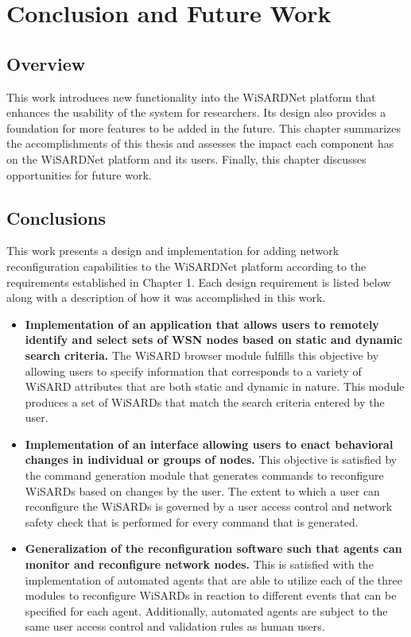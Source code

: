 
\chapter{Conclusion and Future Work}
\label{Chapter 7}


\section{Overview}
This work introduces new functionality into the WiSARDNet platform that enhances the usability of the system for researchers. Its design also provides a foundation for more features to be added in the future. This chapter summarizes the accomplishments of this thesis and assesses the impact each component has on the WiSARDNet platform and its users. Finally, this chapter discusses opportunities for future work. 

\section{Conclusions}
This work presents a design and implementation for adding network reconfiguration capabilities to the WiSARDNet platform according to the requirements established in Chapter 1. Each design requirement is listed below along with a description of how it was accomplished in this work.

\begin{itemize}
	\item \textbf{Implementation of an application that allows users to remotely identify and select sets of WSN nodes based on static and dynamic search criteria.} The WiSARD browser module fulfills this objective by allowing users to specify information that corresponds to a variety of WiSARD attributes that are both static and dynamic in nature. This module produces a set of WiSARDs that match the search criteria entered by the user. 

	\item \textbf{Implementation of an interface allowing users to enact behavioral changes in individual or groups of nodes.} This objective is satisfied by the command generation module that generates commands to reconfigure WiSARDs based on changes by the user. The extent to which a user can reconfigure the WiSARDs is governed by a user access control  and network safety check that is performed for every command that is generated.

	\item \textbf{Generalization of the reconfiguration software such that agents can monitor and reconfigure network nodes.} This is satisfied with the implementation of automated agents that are able to utilize each of the three modules to reconfigure WiSARDs in reaction to different events that can be specified for each agent. Additionally, automated agents are subject to the same user access control and validation rules as human users.
\end{itemize}


